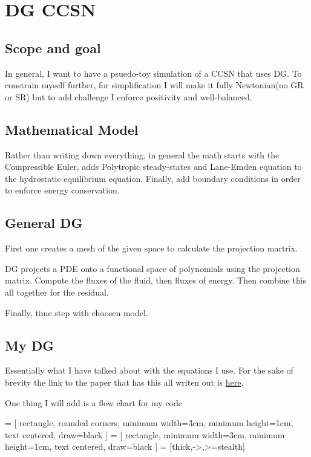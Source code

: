 \chapter{DG CCSN}

\section{Scope and goal}

In general, I want to have a psuedo-toy simulation of a CCSN that uses DG. To constrain myself further, for simplification I will make it fully Newtonian(no GR or SR) but to add challenge I enforce positivity and well-balanced.

\section{Mathematical Model}

Rather than writing down everything, in general the math starts with the Compressible Euler, adds Polytropic steady-states and Lane-Emden equation to the hydrostatic equilibrium equation. Finally, add boundary conditions in order to enforce energy conservation.

\section{General DG}

First one creates a mesh of the given space to calculate the projection martrix.

DG projects a PDE onto a functional space of polynomials using the projection matrix. Compute the fluxes of the fluid, then fluxes of energy. Then combine this all together for the residual.

Finally, time step with choosen model.

\section{My DG}

Essentially what I have talked about with the equations I use. For the sake of brevity the link to the paper that has this all writen out is \href{https://www.sciencedirect.com/science/article/pii/S0021999126001579}{here}.

One thing I will add is a flow chart for my code


 = [
    rectangle, rounded corners,
    minimum width=3cm, minimum height=1cm,
    text centered, draw=black
]
 = [
    rectangle,
    minimum width=3cm, minimum height=1cm,
    text centered, draw=black
]
 = [thick,->,>=stealth]



